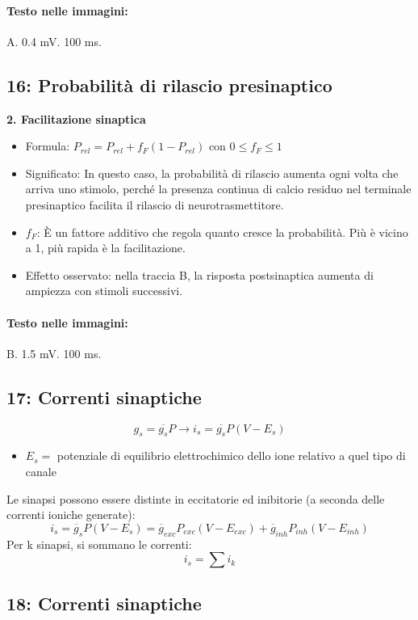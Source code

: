 \paragraph*{Testo nelle immagini:}
A. 0.4 mV. 100 ms.


\subsection*{ 16: Probabilità di rilascio presinaptico}

\textbf{2. Facilitazione sinaptica}
\begin{itemize}
    \item Formula: $P_{rel} = P_{rel} + f_{F}(1 - P_{rel})$ con $0 \le f_{F} \le 1$
    \item Significato: In questo caso, la probabilità di rilascio aumenta ogni volta che arriva uno stimolo, perché la presenza continua di calcio residuo nel terminale presinaptico facilita il rilascio di neurotrasmettitore.
    \item $f_{F}$: È un fattore additivo che regola quanto cresce la probabilità. Più è vicino a 1, più rapida è la facilitazione.
    \item Effetto osservato: nella traccia B, la risposta postsinaptica aumenta di ampiezza con stimoli successivi.
\end{itemize}

\paragraph*{Testo nelle immagini:}
B. 1.5 mV. 100 ms.


\subsection*{ 17: Correnti sinaptiche}

\[ g_{s} = \overline{g_{s}} P \rightarrow i_{s} = \overline{g_{s}} P (V - E_{s}) \]
\begin{itemize}
    \item $E_{s} =$ potenziale di equilibrio elettrochimico dello ione relativo a quel tipo di canale
\end{itemize}
Le sinapsi possono essere distinte in eccitatorie ed inibitorie (a seconda delle correnti ioniche generate):
\[ i_{s} = \overline{g}_{s} P (V - E_{s}) = \overline{g}_{exc} P_{exc} (V - E_{exc}) + \overline{g}_{inh} P_{inh} (V - E_{inh}) \]
Per k sinapsi, si sommano le correnti:
\[ i_{s} = \sum i_{k} \]


\subsection*{ 18: Correnti sinaptiche}

